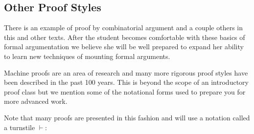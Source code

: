   \subsection{Other Proof Styles}
There is an example of proof by combinatorial argument and a couple others in this and other texts. After the student becomes comfortable with these basics of formal argumentation we believe she will be well prepared to expand her ability to learn new techniques of mounting formal arguments.

Machine proofs are an area of research and many more rigorous proof styles have been described in the past 100 years. This is beyond the scope of an introductory proof class but we mention some of the notational forms used to prepare you for more advanced work. 

Note that many proofs are presented in this fashion and will use a notation called a turnstile $\vdash$:
    
